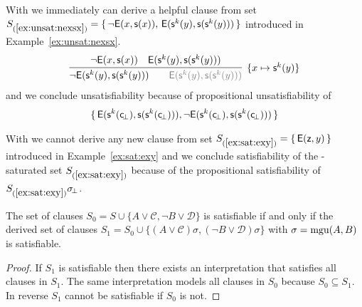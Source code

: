 \begin{example}
	With \InstGen{} we immediately can derive a helpful clause from set
\(
	S_{(\ref{ex:unsat:nexsx})} =
 \{ \,
{ \lnot\mathsf{E}(x, \mathsf{s}(x)) }, \,
{ \mathsf{E}(\mathsf{s}^k(y), \mathsf{s}(\mathsf{s}^k(y)))}
 \, \}
 \)
 introduced in Example~\ref{ex:unsat:nexsx}.
\begin{gather*}
\infer[ \{ x\mapsto\msucc^k(y)\}]{
	{ \lnot\mE(\msucc^k(y), \msucc(\msucc^k(y)))} \qquad
	{\colG \mE(\msucc^k(y), \msucc(\msucc^k(y)))}
}{
	{ \lnot\mE(x, \msucc(x)) } &
	{ \mE(\msucc^k(y), \msucc(\msucc^k(y)))}
}
\end{gather*}
and we conclude unsatisfiability because of propositional unsatisfiability of
\begin{gather*}
 \{ \,
	\mathsf{E}(\mathsf{s}^k(\mathsf{c} \!_\bot), \mathsf{s}(\mathsf{s}^k(\mathsf{c} \!_\bot))), \lnot\mathsf{E}(\mathsf{s}^k(\mathsf{c} \!_\bot), \mathsf{s}(\mathsf{s}^k(\mathsf{c} \!_\bot)))
 \, \}
\end{gather*}

\end{example}

\begin{example}
	With \InstGen{} we cannot derive any new clause from set
	\( S_{(\ref{ex:sat:exy}) } = \{ \, \mathsf{E}(\mathsf{z},y) \, \} \)
	introduced in Example~\ref{ex:sat:exy} and we conclude satisfiability
	of the \InstGen-saturated set \( S_{(\ref{ex:sat:exy}) } \)
	because of the propositional satisfiability of
	\( S_{(\ref{ex:sat:exy})}\sigma \!_\bot \).
\end{example}

\begin{lemma}
	The set of clauses
	\(
		S_0 = S \cup
	 \{
		 A\lor\mathcal C, \lnot B\lor\mathcal D
	\}
	 \)
	is satisfiable if and only if
	the derived set of clauses
	\( S_1 = S_0 \cup \{ (A\lor\mathcal C)\sigma, (\lnot B\lor\mathcal D)\sigma \} \)
	with \( \sigma = \operatorname{mgu}(A,B) \) is satisfiable.
\end{lemma}

\begin{proof}
	If \( S_1 \) is satisfiable then there exists an interpretation that satisfies all clauses in \( S_1 \).
	The same interpretation models all clauses in \( S_0 \) because \( S_0\subseteq S_1 \).
	In reverse \( S_1 \) cannot be satisfiable if \( S_0 \) is not.


\end{proof}

